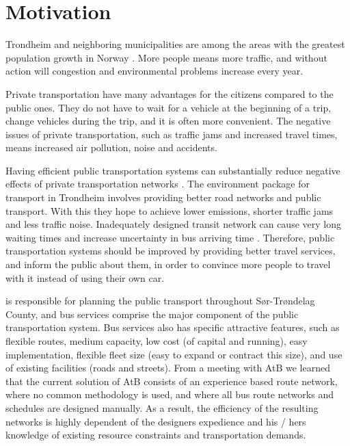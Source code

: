 \section{Motivation}

Trondheim and neighboring municipalities are among the areas with the greatest population growth in Norway \citep{website:miljopakken}. More people means more traffic, and without action will congestion and environmental problems increase every year. 

Private transportation have many advantages for the citizens compared to the public ones. They do not have to wait for a vehicle at the beginning of a trip, change vehicles during the trip, and it is often more convenient. The negative issues of private transportation, such as traffic jams and increased travel times, means increased air pollution, noise and accidents. 

Having efficient public transportation systems can substantially reduce negative effects of private transportation networks 
\citep{kechagiopoulos13} . The environment package \citep{website:miljopakken} for transport in Trondheim involves providing better road networks and public transport. With this they hope to achieve lower emissions, shorter traffic jams and less traffic noise. Inadequately designed transit network can cause very long waiting times and increase uncertainty in bus arriving time \citep{nikolic14}. Therefore, public transportation systems should be improved by providing better travel services, and inform the public about them, in order to convince more people to travel with it instead of using their own car. 

 \citet{website:atb} is responsible for planning the public transport throughout Sør-Trøndelag County, and bus services comprise the major component of the public transportation system. Bus services also has specific attractive features, such as flexible routes, medium capacity, low cost (of capital and running), easy implementation, flexible fleet size (easy to expand or contract this size), and use of existing facilities (roads and streets). From a meeting with AtB we learned that the current solution of AtB consists of an experience based route network, where no common methodology is used, and where all bus route networks and schedules are designed manually. As a result, the efficiency of the resulting networks is highly dependent of the designers expedience and his / hers knowledge of existing resource constraints and transportation demands.

